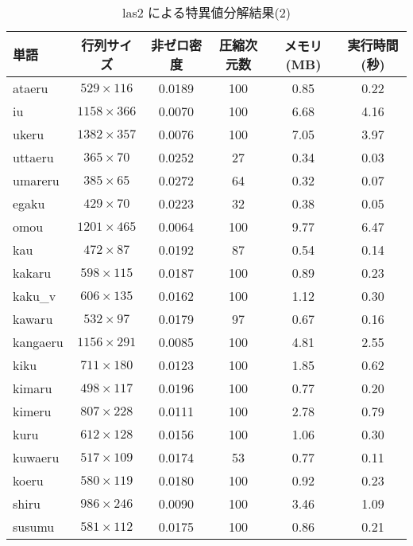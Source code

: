 \begin{table}[ht]
\scriptsize
  \begin{center}
    \leavevmode
    \caption{las2 による特異値分解結果(2)}
    \begin{tabular}{|p{}|c|c|c|c|c|} \hline
単語  &  行列サイズ &  非ゼロ密度 &  圧縮次元数 &   メモリ(MB) & 実行時間(秒) \\ \hline
ataeru & \( 529 \times 116 \) & 0.0189     &  100  & 0.85   & 0.22    \\
iu & \( 1158 \times 366 \) & 0.0070        &  100  & 6.68   & 4.16        \\
ukeru & \( 1382 \times 357 \) & 0.0076     &  100  & 7.05   & 3.97     \\
uttaeru & \( 365 \times 70 \) & 0.0252     &  27   & 0.34   & 0.03   \\
umareru & \( 385 \times 65 \) & 0.0272     &  64   & 0.32   & 0.07   \\
egaku & \( 429 \times 70 \) & 0.0223       &  32   & 0.38   & 0.05     \\
omou & \( 1201 \times 465 \) & 0.0064      &  100  & 9.77   & 6.47      \\
kau & \( 472 \times 87 \) & 0.0192         &  87   & 0.54   & 0.14       \\
kakaru & \( 598 \times 115 \) & 0.0187     &  100  & 0.89   & 0.23    \\
kaku\_v & \( 606 \times 135 \) & 0.0162    &  100  & 1.12   & 0.30     \\
kawaru & \( 532 \times 97 \) & 0.0179      &  97   & 0.67   & 0.16    \\
kangaeru & \( 1156 \times 291 \) & 0.0085  &  100  & 4.81   & 2.55  \\
kiku & \( 711 \times 180 \) & 0.0123       &  100  & 1.85   & 0.62      \\
kimaru & \( 498 \times 117 \) & 0.0196     &  100  & 0.77   & 0.20     \\
kimeru & \( 807 \times 228 \) & 0.0111     &  100  & 2.78   & 0.79    \\
kuru & \( 612 \times 128 \) & 0.0156       &  100  & 1.06   & 0.30       \\
kuwaeru & \( 517 \times 109 \) & 0.0174    &  53   & 0.77   & 0.11   \\
koeru & \( 580 \times 119 \) & 0.0180      &  100  & 0.92   & 0.23     \\
shiru & \( 986 \times 246 \) & 0.0090      &  100  & 3.46   & 1.09     \\
susumu & \( 581 \times 112 \) & 0.0175     &  100  & 0.86   & 0.21    \\

\end{tabular}
\end{center}
\end{table}

